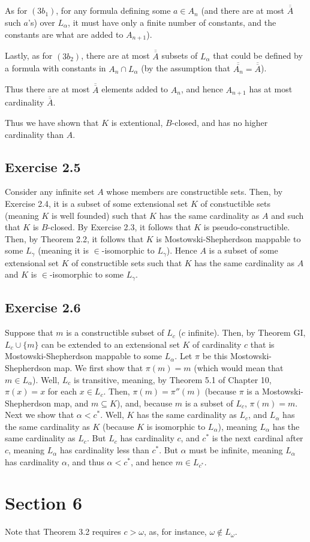 \documentclass{article}
\theoremstyle{definition}
\begin{document}
As for $(3b_1)$, for any formula defining some $a\in A_n$ (and there are at most $\overline{\overline{A}}$ such $a$'s) over 
$L_\alpha$, it must have only a finite number of constants, and the constants are what are added to $A_{n+1}$).

Lastly, as for $(3b_2)$, there are at most $\overline{\overline{A}}$ subsets of $L_\alpha$ that could be defined by a formula with 
constants in $A_n\cap L_\alpha$ (by the assumption that $\overline{\overline{A_n}}=\overline{\overline{A}}$).

Thus there are at most $\overline{\overline{A}}$ elements added to $A_n$, and hence $A_{n+1}$ has at most cardinality 
$\overline{\overline{A}}$.

Thus we have shown that $K$ is extentional, $B$-closed, and has no higher cardinality than $A$.

\subsection*{Exercise 2.5}
Consider any infinite set $A$ whose members are constructible sets. Then, by Exercise 2.4, it is a subset of some extensional 
set $K$ of constuctible sets (meaning $K$ is well founded) such that $K$ has the same cardinality as $A$ and such that $K$ is $B$-closed. By Exercise 2.3, 
it follows that $K$ is pseudo-constructible. Then, by Theorem 2.2, it follows that 
$K$ is Mostowski-Shepherdson mappable to some $L_\gamma$ (meaning it is $\in$-isomorphic to $L_\gamma$). Hence 
$A$ is a subset of some extensional set $K$ of constructible sets such that $K$ has the same cardinality as $A$ and 
$K$ is $\in$-isomorphic to some $L_\gamma$.

\subsection*{Exercise 2.6}
Suppose that $m$ is a constructible subset of $L_c$ ($c$ infinite). Then, by Theorem GI, $L_c\cup\{m\}$ can be extended to an 
extensional set $K$ of cardinality $c$ that is Mostowski-Shepherdson mappable to some $L_\alpha$. Let $\pi$ be this 
Mostowski-Shepherdson map. We first show that $\pi(m)=m$ (which would mean that $m\in L_\alpha$). 
Well, $L_c$ is transitive, meaning, by Theorem 5.1 of Chapter 10, 
$\pi(x)=x$ for each $x\in L_c$. Then, $\pi(m)=\pi''(m)$ (because $\pi$ is a Mostowski-Shepherdson map, and $m\subseteq K$), 
and, because $m$ is a subset of $L_c$, 
$\pi(m)=m$. Next we show that $\alpha<c^*$. Well, $K$ has the same cardinality as $L_c$, and $L_\alpha$ has the same 
cardinality as $K$ (because $K$ is isomorphic to $L_\alpha$), meaning $L_\alpha$ has the same cardinality as 
$L_c$. But $L_c$ has cardinality $c$, and $c^*$ is the next cardinal after $c$, meaning $L_\alpha$ has cardinality 
less than $c^*$. But $\alpha$ must be infinite, meaning $L_\alpha$ has cardinality $\alpha$, and thus 
$\alpha<c^*$, and hence $m\in L_{c^*}$.

\section*{Section 6}
Note that Theorem 3.2 requires $c>\omega$, as, for instance, $\omega\notin L_\omega$.
\end{document}
